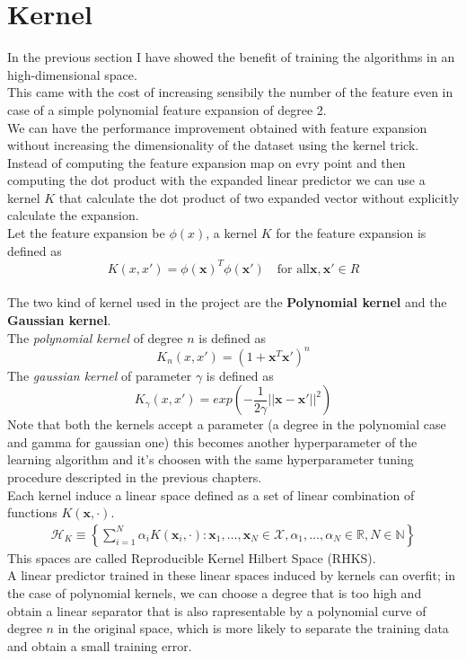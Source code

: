 \newpage
\section{Kernel}
In the previous section I have showed the benefit of training the algorithms in an high-dimensional space.\\
This came with the cost of increasing sensibily the number of the feature even in case of a simple polynomial feature expansion of degree 2.\\
We can have the performance improvement obtained with feature expansion without increasing the dimensionality of the dataset using the kernel trick.\\
Instead of computing the feature expansion map on evry point and then computing the dot product with the expanded linear predictor we can use a kernel $K$ that calculate the dot product of two expanded vector without explicitly calculate the expansion.\\
Let the feature expansion be $\phi(x)$, a kernel $K$ for the feature expansion is defined as $$K(x, x') = \phi(\boldsymbol{x})^T \phi(\boldsymbol{x'}) \quad \text{for all} \boldsymbol{x}, \boldsymbol{x'} \in R$$\\
The two kind of kernel used in the project are the \textbf{Polynomial kernel} and the \textbf{Gaussian kernel}.\\
The \textit{polynomial kernel} of degree $n$ is defined as $$K_n(x, x') = (1 + \boldsymbol{x}^T \boldsymbol{x'})^n$$
The \textit{gaussian kernel} of parameter $\gamma$ is defined as $$K_\gamma(x, x') = exp(-\frac{1}{2\gamma}||\boldsymbol{x} - \boldsymbol{x'}||^2)$$
Note that both the kernels accept a parameter (a degree in the polynomial case and gamma for gaussian one) this becomes another hyperparameter of the learning algorithm
and it's choosen with the same hyperparameter tuning procedure descripted in the previous chapters.\\ 
Each kernel induce a linear space defined as a set of linear combination of functions $K(\boldsymbol{x}, \cdot)$.\\
\begin{align*}
    \mathcal{H}_K \equiv \left\{ \sum_{i=1}^N \alpha_i K(\boldsymbol{x}_i, \cdot) : \boldsymbol{x}_1, \dots, \boldsymbol{x}_N \in \mathcal{X}, \alpha_1, \dots, \alpha_N \in \mathbb{R}, N \in \mathbb{N} \right\}
\end{align*}
This spaces are called Reproducible Kernel Hilbert Space (RHKS).\\
A linear predictor trained in these linear spaces induced by kernels can overfit; in the case of polynomial kernels, we can choose a degree that is too high and obtain a linear separator that is also rapresentable by a polynomial curve of degree $n$ in the original space, which is more likely to separate the training data and obtain a small training error.\\

